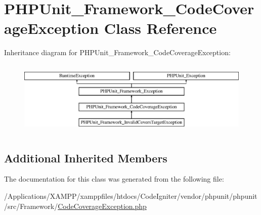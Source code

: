 \hypertarget{class_p_h_p_unit___framework___code_coverage_exception}{}\section{P\+H\+P\+Unit\+\_\+\+Framework\+\_\+\+Code\+Coverage\+Exception Class Reference}
\label{class_p_h_p_unit___framework___code_coverage_exception}
Inheritance diagram for P\+H\+P\+Unit\+\_\+\+Framework\+\_\+\+Code\+Coverage\+Exception\+:\begin{figure}[H]
\begin{center}
\leavevmode
\includegraphics[height=3.589744cm]{class_p_h_p_unit___framework___code_coverage_exception}
\end{center}
\end{figure}
\subsection*{Additional Inherited Members}


The documentation for this class was generated from the following file\+:\begin{DoxyCompactItemize}
\item 
/\+Applications/\+X\+A\+M\+P\+P/xamppfiles/htdocs/\+Code\+Igniter/vendor/phpunit/phpunit/src/\+Framework/\mbox{\hyperlink{_code_coverage_exception_8php}{Code\+Coverage\+Exception.\+php}}\end{DoxyCompactItemize}
